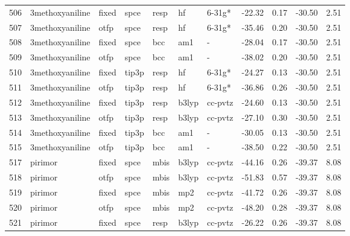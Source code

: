 \begin{tabular}{lllllllrrrr}
506 &               3methoxyaniline &  fixed &   spce &   resp &      hf &       6-31g* &      -22.32 &     0.17 &      -30.50 &      2.51 \\
507 &               3methoxyaniline &   otfp &   spce &   resp &      hf &       6-31g* &      -35.46 &     0.20 &      -30.50 &      2.51 \\
508 &               3methoxyaniline &  fixed &   spce &    bcc &     am1 &            - &      -28.04 &     0.17 &      -30.50 &      2.51 \\
509 &               3methoxyaniline &   otfp &   spce &    bcc &     am1 &            - &      -38.02 &     0.20 &      -30.50 &      2.51 \\
510 &               3methoxyaniline &  fixed &  tip3p &   resp &      hf &       6-31g* &      -24.27 &     0.13 &      -30.50 &      2.51 \\
511 &               3methoxyaniline &   otfp &  tip3p &   resp &      hf &       6-31g* &      -36.86 &     0.26 &      -30.50 &      2.51 \\
512 &               3methoxyaniline &  fixed &  tip3p &   resp &   b3lyp &      cc-pvtz &      -24.60 &     0.13 &      -30.50 &      2.51 \\
513 &               3methoxyaniline &   otfp &  tip3p &   resp &   b3lyp &      cc-pvtz &      -27.10 &     0.30 &      -30.50 &      2.51 \\
514 &               3methoxyaniline &  fixed &  tip3p &    bcc &     am1 &            - &      -30.05 &     0.13 &      -30.50 &      2.51 \\
515 &               3methoxyaniline &   otfp &  tip3p &    bcc &     am1 &            - &      -38.50 &     0.22 &      -30.50 &      2.51 \\
517 &                       pirimor &  fixed &   spce &   mbis &   b3lyp &      cc-pvtz &      -44.16 &     0.26 &      -39.37 &      8.08 \\
518 &                       pirimor &   otfp &   spce &   mbis &   b3lyp &      cc-pvtz &      -51.83 &     0.57 &      -39.37 &      8.08 \\
519 &                       pirimor &  fixed &   spce &   mbis &     mp2 &      cc-pvtz &      -41.72 &     0.26 &      -39.37 &      8.08 \\
520 &                       pirimor &   otfp &   spce &   mbis &     mp2 &      cc-pvtz &      -48.20 &     0.28 &      -39.37 &      8.08 \\
521 &                       pirimor &  fixed &   spce &   resp &   b3lyp &      cc-pvtz &      -26.22 &     0.26 &      -39.37 &      8.08 \\

\end{tabular}
